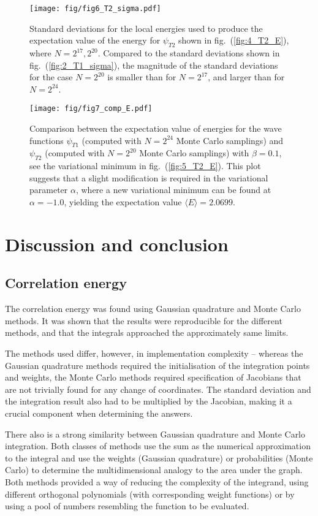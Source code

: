 \documentclass[a4paper,11pt]{article}
\begin{document}
\begin{figure}[htpb]
    \centering
    \texttt{[image: fig/fig6\_T2\_sigma.pdf]}
    \caption{Standard deviations for the local energies used to produce the expectation value of the energy for $\psi_{T2}$ shown in fig.~(\ref{fig:4_T2_E}), where $N=2^{17}, 2^{20}$. Compared to the standard deviations shown in fig.~(\ref{fig:2_T1_sigma}), the magnitude of the standard deviations for the case $N=2^{20}$ is smaller than for $N=2^{17}$, and larger than for $N=2^{24}$. }
    \label{fig:6_T2_sigma}
\end{figure}

\begin{figure}[htb]
    \centering
    \texttt{[image: fig/fig7\_comp\_E.pdf]}
    \caption{Comparison between the expectation value of energies for the wave functions $\psi_{T1}$ (computed with $N=2^{24}$ Monte Carlo samplings) and $\psi_{T2}$ (computed with $N=2^{20}$ Monte Carlo samplings) with $\beta=0.1$, see the variational minimum in fig.~(\ref{fig:5_T2_E}). This plot suggests that a slight modification is required in the variational parameter $\alpha$, where a new variational minimum can be found at $\alpha=-1.0$, yielding the expectation value $\langle E \rangle = 2.0699$.}
    \label{fig:7_comp_E}
\end{figure}

\section{Discussion and conclusion}
\subsection{Correlation energy}
The correlation energy was found using Gaussian quadrature and Monte Carlo methods. It was shown that the results were reproducible for the different methods, and that the integrals approached the approximately same limits.

The methods used differ, however, in implementation complexity -- whereas the Gaussian quadrature methods required the initialisation of the integration points and weights, the Monte Carlo methods required specification of Jacobians that are not trivially found for any change of coordinates. The standard deviation and the integration result also had to be multiplied by the Jacobian, making it a crucial component when determining the answers. 

There also is a strong similarity between Gaussian quadrature and Monte Carlo integration. Both classes of methods use the sum as the numerical approximation to the integral and use the weights (Gaussian quadrature) or probabilities (Monte Carlo) to determine the multidimensional analogy to the area under the graph. Both methods provided a way of reducing the complexity of the integrand, using different orthogonal polynomials (with corresponding weight functions) or by using a pool of numbers resembling the function to be evaluated.
\end{document}
